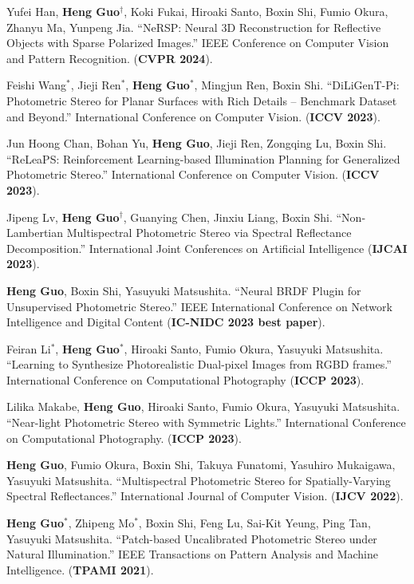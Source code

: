 \documentclass[UTF8]{ctexart}
\begin{document}
\begin{enumerate}[label={[\arabic*]}]
		\item Yufei Han, \textbf{Heng Guo$^\dagger$}, Koki Fukai, Hiroaki Santo, Boxin Shi, Fumio Okura, Zhanyu Ma, Yunpeng Jia. ``NeRSP: Neural 3D Reconstruction for Reflective Objects with Sparse Polarized Images.'' IEEE Conference on Computer Vision and Pattern Recognition. (\textbf{CVPR 2024}).
		\item Feishi Wang$^*$, Jieji Ren$^*$, \textbf{Heng Guo}$^*$, Mingjun Ren, Boxin Shi. ``DiLiGenT-Pi: Photometric Stereo for Planar Surfaces with Rich Details – Benchmark Dataset and Beyond.'' International Conference on Computer Vision. (\textbf{ICCV 2023}).
		\item Jun Hoong Chan, Bohan Yu, \textbf{Heng Guo}, Jieji Ren, Zongqing Lu, Boxin Shi. ``ReLeaPS: Reinforcement Learning-based Illumination Planning for Generalized Photometric Stereo.'' International Conference on Computer Vision. (\textbf{ICCV 2023}).
		\item Jipeng Lv, \textbf{Heng Guo$^{\dagger}$}, Guanying Chen, Jinxiu Liang, Boxin Shi. ``Non-Lambertian Multispectral Photometric Stereo via Spectral Reflectance Decomposition.'' International Joint Conferences on Artificial Intelligence (\textbf{IJCAI 2023}).
		\item \textbf{Heng Guo}, Boxin Shi, Yasuyuki Matsushita. ``Neural BRDF Plugin for Unsupervised Photometric Stereo.'' IEEE International Conference on Network Intelligence and Digital Content (\textbf{IC-NIDC 2023 best paper}).
		\item Feiran Li$^*$, \textbf{Heng Guo}$^*$, Hiroaki Santo, Fumio Okura, Yasuyuki Matsushita. ``Learning to Synthesize Photorealistic Dual-pixel Images from RGBD frames.'' International Conference on Computational Photography (\textbf{ICCP 2023}).
		\item Lilika Makabe, \textbf{Heng Guo}, Hiroaki Santo, Fumio Okura, Yasuyuki Matsushita. ``Near-light Photometric Stereo with Symmetric Lights.'' International Conference on Computational Photography. (\textbf{ICCP 2023}).
		\item \textbf{Heng Guo}, Fumio Okura, Boxin Shi, Takuya Funatomi, Yasuhiro Mukaigawa, Yasuyuki Matsushita. ``Multispectral Photometric Stereo for Spatially-Varying Spectral Reflectances.'' International Journal of Computer Vision. (\textbf{IJCV 2022}). 
		\item \textbf{Heng Guo$^*$}, Zhipeng Mo$^*$, Boxin Shi, Feng Lu, Sai-Kit Yeung, Ping Tan, Yasuyuki Matsushita. ``Patch-based Uncalibrated Photometric Stereo under Natural Illumination.'' 
		IEEE Transactions on Pattern Analysis and Machine Intelligence. (\textbf{TPAMI 2021}). 

\end{enumerate}
\end{document}
